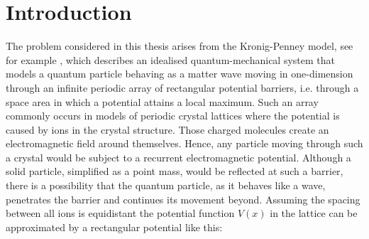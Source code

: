 \chapter{Introduction} \label{chap1}

The problem considered in this thesis arises from the Kronig-Penney model, see for example \cite[Chap. 3]{HeeringEP}, which describes an idealised quantum-mechanical system that models a quantum particle behaving as a matter wave moving in one-dimension through an infinite periodic array of rectangular potential barriers, i.e. through a space area in which a potential attains a local maximum. Such an array commonly occurs in models of periodic crystal lattices where the potential is caused by ions in the crystal structure. Those charged molecules create an electromagnetic field around themselves. Hence, any particle moving through such a crystal would be subject to a recurrent electromagnetic potential. Although a solid particle, simplified as a point mass, would be reflected at such a barrier, there is a possibility that the quantum particle, as it behaves like a wave, penetrates the barrier and continues its movement beyond. Assuming the spacing between all ions is equidistant the potential function $V(x)$ in the lattice can be approximated by a rectangular potential like this:

